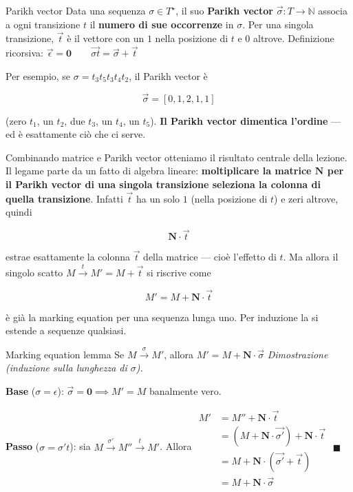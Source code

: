\begin{boxdefinition}{Parikh vector}
Data una sequenza $\sigma \in T^\star$, il suo \textbf{Parikh vector} $\vec{\sigma} : T \to \mathbb{N}$ associa a ogni transizione $t$ il \textbf{numero di sue occorrenze} in $\sigma$. Per una singola transizione, $\vec{t}$ è il vettore con un $1$ nella posizione di $t$ e $0$ altrove. Definizione ricorsiva: \(\vec{\epsilon} = \mathbf{0} \qquad \overrightarrow{\sigma t} = \vec{\sigma} + \vec{t}\)
\end{boxdefinition}

Per esempio, se $\sigma = t_3 t_5 t_3 t_4 t_2$, il Parikh vector è

\[
\vec{\sigma} = [0, 1, 2, 1, 1]
\]

(zero $t_1$, un $t_2$, due $t_3$, un $t_4$, un $t_5$). \textbf{Il Parikh vector dimentica l'ordine} — ed è esattamente ciò che ci serve.

Combinando matrice e Parikh vector otteniamo il risultato centrale della lezione. Il legame parte da un fatto di algebra lineare: \textbf{moltiplicare la matrice $\mathbf{N}$ per il Parikh vector di una singola transizione seleziona la colonna di quella transizione}. Infatti $\vec{t}$ ha un solo $1$ (nella posizione di $t$) e zeri altrove, quindi

\[
\mathbf{N} \cdot \vec{t}
\]

estrae esattamente la colonna $\vec{t}$ della matrice — cioè l'effetto di $t$. Ma allora il singolo scatto $M \xrightarrow{t} M' = M + \vec{t}$ si riscrive come

\[
M' = M + \mathbf{N} \cdot \vec{t}
\]

è già la marking equation per una sequenza lunga uno. Per induzione la si estende a sequenze qualsiasi.

\begin{boxtheorem}{Marking equation lemma}
Se $M \xrightarrow{\sigma} M'$, allora \(M' = M + \mathbf{N} \cdot \vec{\sigma}\) \emph{Dimostrazione (induzione sulla lunghezza di $\sigma$).}

\textbf{Base} ($\sigma = \epsilon$): \(\vec{\sigma} = \mathbf{0} \implies M' = M\) banalmente vero.

\textbf{Passo} ($\sigma = \sigma' t$): sia $M \xrightarrow{\sigma'} M'' \xrightarrow{t} M'$. Allora \( \begin{aligned} M' &= M'' + \mathbf{N}\cdot\vec{t} \\ &= (M + \mathbf{N}\cdot\vec{\sigma'}) + \mathbf{N}\cdot\vec{t} \\ &= M + \mathbf{N}\cdot(\vec{\sigma'} + \vec{t}) \\ &= M + \mathbf{N}\cdot\vec{\sigma} \end{aligned} \) $\blacksquare$
\end{boxtheorem}

